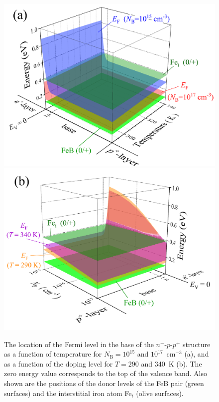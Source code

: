 \documentclass[a4paper,fleqn]{cas-sc}
\begin{document}
\begin{figure}
	\centering
     \includegraphics[width=0.49\linewidth]{Fig4a.png}
     \includegraphics[width=0.49\linewidth]{Fig4b.png}
	  \caption{The location of the Fermi level in the base of the $n^+$-$p$-$p^+$ structure 
       as a function of temperature for $N_\mathrm{B}=10^{15}$ and $10^{17}$~cm$^{-3}$ (a), 
       and as a function of the doping level for $T=290$ and 340~K (b). 
       The zero energy value corresponds to the top of the valence band. 
       Also shown are the positions of the donor levels of the FeB pair (green surfaces) 
       and the interstitial iron atom Fe$_i$ (olive surfaces).
}\label{fig4}
\end{figure}
\end{document}
